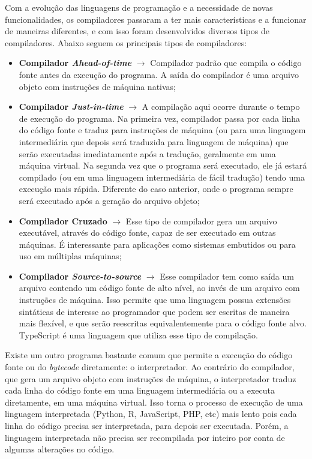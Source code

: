 Com a evolução das linguagens de programação e a necessidade de novas funcionalidades, os compiladores passaram a ter mais características e a funcionar de maneiras diferentes, e com isso foram desenvolvidos diversos tipos de compiladores. Abaixo seguem os principais tipos de compiladores:
\begin{itemize}
    \item \textbf{Compilador \textit{Ahead-of-time}} $\rightarrow$ Compilador padrão que compila o código fonte antes da execução do programa. A saída do compilador é uma arquivo objeto com instruções de máquina nativas;
    \item \textbf{Compilador \textit{Just-in-time}} $\rightarrow$ A compilação aqui ocorre durante o tempo de execução do programa. Na primeira vez, compilador passa por cada linha do código fonte e traduz para instruções de máquina (ou para uma linguagem intermediária que depois será traduzida para linguagem de máquina) que serão executadas imediatamente após a tradução, geralmente em uma máquina virtual. Na segunda vez que o programa será executado, ele já estará compilado (ou em uma linguagem intermediária de fácil tradução) tendo uma execução mais rápida. Diferente do caso anterior, onde o programa sempre será executado após a geração do arquivo objeto;
    \item \textbf{Compilador Cruzado} $\rightarrow$ Esse tipo de compilador gera um arquivo executável, através do código fonte, capaz de ser executado em outras máquinas. É interessante para aplicações como sistemas embutidos ou para uso em múltiplas máquinas;
    \item \textbf{Compilador \textit{Source-to-source}} $\rightarrow$ Esse compilador tem como saída um arquivo contendo um código fonte de alto nível, ao invés de um arquivo com instruções de máquina. Isso permite que uma linguagem possua extensões sintáticas de interesse ao programador que podem ser escritas de maneira mais flexível, e que serão reescritas equivalentemente para o código fonte alvo. TypeScript é uma linguagem que utiliza esse tipo de compilação.
\end{itemize}

Existe um outro programa bastante comum que permite a execução do código fonte ou do \textit{\gls{bytecode}} diretamente: o interpretador. Ao contrário do compilador, que gera um arquivo objeto com instruções de máquina, o interpretador traduz cada linha do código fonte em uma linguagem intermediária ou a executa diretamente, em uma máquina virtual. Isso torna o processo de execução de uma linguagem interpretada (Python, R, JavaScript, PHP, etc) mais lento pois cada linha do código precisa ser interpretada, para depois ser executada. Porém, a linguagem interpretada não precisa ser recompilada por inteiro por conta de algumas alterações no código.

